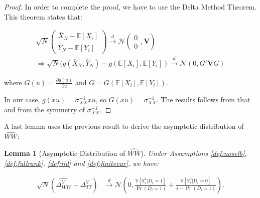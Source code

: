 \documentclass[
]{book}
\newcommand{\esp}[1]{\mathbb{E}[ #1 ]}
\newcommand{\var}[1]{\mathbb{V}[ #1 ]}
\newcommand{\partder}[2]{\frac{\partial #1}{\partial #2}}
\newtheorem{lemma}{Lemma}[chapter]
\theoremstyle{definition}
\theoremstyle{definition}
\theoremstyle{definition}
\theoremstyle{definition}
\theoremstyle{remark}
\begin{document}
\begin{proof}
In order to complete the proof, we have to use the Delta Method Theorem.
This theorem states that:

\begin{gather*}
  \sqrt{N}(\begin{array}{c} \bar{X}_N-\esp{X_i}\\   \bar{Y}_N-\esp{Y_i}\end{array})  \stackrel{d}{\rightarrow}\mathcal{N}(\begin{array}{c}  0\\ 0\end{array},\mathbf{V}) \\
\Rightarrow \sqrt{N}(g(\bar{X}_N,\bar{Y}_N)-g(\esp{X_i},\esp{Y_i})  \stackrel{d}{\rightarrow}\mathcal{N}(0,G'\mathbf{V}G)
\end{gather*}

where \(G(u)=\partder{g(u)}{u}\) and \(G=G(\esp{X_i},\esp{Y_i})\).

In our case, \(g(xu)=\sigma_{XX}^{-1}xu\), so \(G(xu)=\sigma_{XX}^{-1}\).
The results follows from that and from the symmetry of \(\sigma_{XX}^{-1}\).
\end{proof}

A last lemma uses the previous result to derive the asymptotic distribution of \(\hat{WW}\):

\begin{lemma}[Asymptotic Distribution of $\hat{WW}$]
\protect\hypertarget{lem:asymWW}{}{\label{lem:asymWW} \iffalse (Asymptotic Distribution of \(\hat{WW}\)) \fi{} }Under Assumptions \ref{def:noselb}, \ref{def:fullrank}, \ref{def:iid} and \ref{def:finitevar}, we have:

\begin{align*}
  \sqrt{N}(\hat{\Delta^Y_{WW}}-\Delta^Y_{TT}) &  \stackrel{d}{\rightarrow}
  \mathcal{N}\left(0,\frac{\var{Y_i^1|D_i=1}}{\Pr(D_i=1)}+\frac{\var{Y_i^0|D_i=0}}{1-\Pr(D_i=1)}\right).
\end{align*}
\end{lemma}
\end{document}
